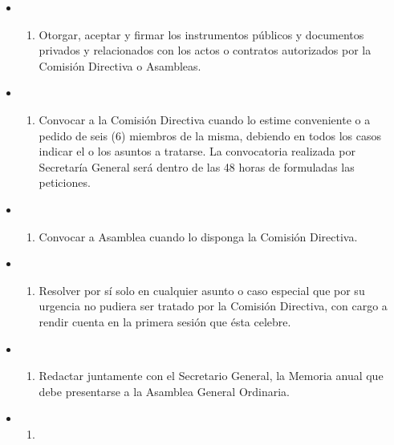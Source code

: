 \documentclass[]{book}
\providecommand{\tightlist}{%
  \setlength{\itemsep}{0pt}\setlength{\parskip}{0pt}}
\begin{document}
\begin{itemize}
\begin{itemize}
\begin{enumerate}
    \end{enumerate}
  \item
    \begin{enumerate}
    \def\labelenumi{\alph{enumi})}
    \setcounter{enumi}{6}
    \tightlist
    \item
      Otorgar, aceptar y firmar los instrumentos públicos y documentos privados y relacionados con los actos o contratos autorizados por la Comisión Directiva o Asambleas.
    \end{enumerate}
  \item
    \begin{enumerate}
    \def\labelenumi{\alph{enumi})}
    \setcounter{enumi}{7}
    \tightlist
    \item
      Convocar a la Comisión Directiva cuando lo estime conveniente o a pedido de seis (6) miembros de la misma, debiendo en todos los casos indicar el o los asuntos a tratarse. La convocatoria realizada por Secretaría General será dentro de las 48 horas de formuladas las peticiones.
    \end{enumerate}
  \item
    \begin{enumerate}
    \def\labelenumi{\roman{enumi})}
    \tightlist
    \item
      Convocar a Asamblea cuando lo disponga la Comisión Directiva.
    \end{enumerate}
  \item
    \begin{enumerate}
    \def\labelenumi{\alph{enumi})}
    \setcounter{enumi}{9}
    \tightlist
    \item
      Resolver por sí solo en cualquier asunto o caso especial que por su urgencia no pudiera ser tratado por la Comisión Directiva, con cargo a rendir cuenta en la primera sesión que ésta celebre.
    \end{enumerate}
  \item
    \begin{enumerate}
    \def\labelenumi{\alph{enumi})}
    \setcounter{enumi}{10}
    \tightlist
    \item
      Redactar juntamente con el Secretario General, la Memoria anual que debe presentarse a la Asamblea General Ordinaria.
    \end{enumerate}
  \item
    \begin{enumerate}
    \def\labelenumi{\alph{enumi})}
    \setcounter{enumi}{11}
    \tightlist
    \item

\end{enumerate}
\end{itemize}
\end{itemize}
\end{document}
